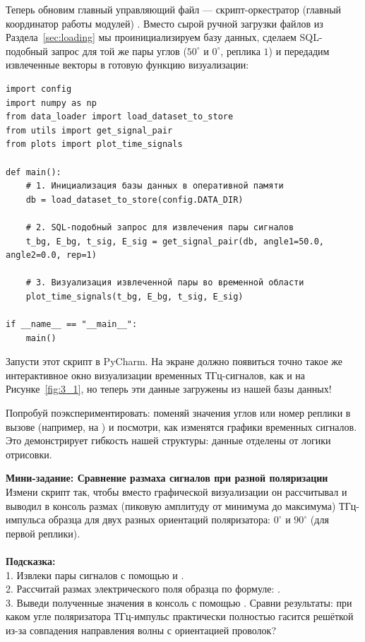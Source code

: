 Теперь обновим главный управляющий файл --- скрипт-оркестратор (главный координатор работы модулей) . Вместо сырой ручной загрузки файлов из Раздела~\ref{sec:loading} мы проинициализируем базу данных, сделаем SQL-подобный запрос для той же пары углов ($50^\circ$ и $0^\circ$, реплика $1$) и передадим извлеченные векторы в готовую функцию визуализации:

\begin{listing}[H]
	\caption{Тест инициализации базы данных и визуализации ()}\label{lst:test_db_load}
	\begin{verbatim}
import config
import numpy as np
from data_loader import load_dataset_to_store
from utils import get_signal_pair
from plots import plot_time_signals

def main():
    # 1. Инициализация базы данных в оперативной памяти
    db = load_dataset_to_store(config.DATA_DIR)
    
    # 2. SQL-подобный запрос для извлечения пары сигналов
    t_bg, E_bg, t_sig, E_sig = get_signal_pair(db, angle1=50.0, angle2=0.0, rep=1)
    
    # 3. Визуализация извлеченной пары во временной области
    plot_time_signals(t_bg, E_bg, t_sig, E_sig)

if __name__ == "__main__":
    main()
	\end{verbatim}
\end{listing}

Запусти этот скрипт в PyCharm. На экране должно появиться точно такое же интерактивное окно визуализации временных ТГц-сигналов, как и на Рисунке~\ref{fig:3_1}, но теперь эти данные загружены из нашей базы данных!

Попробуй поэкспериментировать: поменяй значения углов или номер реплики в вызове  (например, на ) и посмотри, как изменятся графики временных сигналов. Это демонстрирует гибкость нашей структуры: данные отделены от логики отрисовки.

\begin{minitaskbox}
	\textbf{Мини-задание: Сравнение размаха сигналов при разной поляризации} \\
	Измени скрипт  так, чтобы вместо графической визуализации он рассчитывал и выводил в консоль размах (пиковую амплитуду от минимума до максимума) ТГц-импульса образца для двух разных ориентаций поляризатора: $0^\circ$ и $90^\circ$ (для первой реплики). \\
	\\
	\textbf{Подсказка:} \\
	1. Извлеки пары сигналов с помощью  и . \\
	2. Рассчитай размах электрического поля образца по формуле: . \\
	3. Выведи полученные значения в консоль с помощью . Сравни результаты: при каком угле поляризатора ТГц-импульс практически полностью гасится решёткой из-за совпадения направления волны с ориентацией проволок?
\end{minitaskbox}

